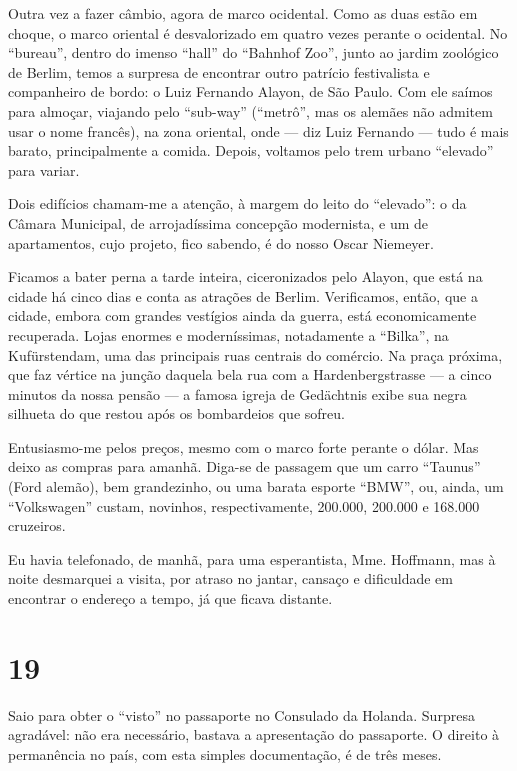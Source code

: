 Outra vez a fazer câmbio, agora de marco ocidental. Como as duas estão em choque, o marco oriental é desvalorizado em quatro vezes perante o ocidental. No ``bureau'', dentro do imenso ``hall'' do ``Bahnhof Zoo'', junto ao jardim zoológico de Berlim, temos a surpresa de encontrar outro patrício festivalista e companheiro de bordo: o Luiz Fernando Alayon, de São Paulo. Com ele saímos para almoçar, viajando pelo ``sub-way'' (``metrô'', mas os alemães não admitem usar o nome francês), na zona oriental, onde --- diz Luiz Fernando --- tudo é mais barato, principalmente a comida. Depois, voltamos pelo trem urbano ``elevado'' para variar.

Dois edifícios chamam-me a atenção, à margem do leito do ``elevado'': o da Câmara Municipal, de arrojadíssima concepção modernista, e um de apartamentos, cujo projeto, fico sabendo, é do nosso Oscar Niemeyer.

Ficamos a bater perna a tarde inteira, ciceronizados pelo Alayon, que está na cidade há cinco dias e conta as atrações de Berlim. Verificamos, então, que a cidade, embora com grandes vestígios ainda da guerra, está economicamente recuperada. Lojas enormes e moderníssimas, notadamente a ``Bilka'', na Kufürstendam, uma das principais ruas centrais do comércio. Na praça próxima, que faz vértice na junção daquela bela rua com a Hardenbergstrasse --- a cinco minutos da nossa pensão --- a famosa igreja de Gedächtnis exibe sua negra silhueta do que restou após os bombardeios que sofreu.

Entusiasmo-me pelos preços, mesmo com o marco forte perante o dólar. Mas deixo as compras para amanhã. Diga-se de passagem que um carro ``Taunus'' (Ford alemão), bem grandezinho, ou uma barata esporte ``BMW'', ou, ainda, um ``Volkswagen'' custam, novinhos, respectivamente, 200.000, 200.000 e 168.000 cruzeiros.

Eu havia telefonado, de manhã, para uma esperantista, Mme. Hoffmann, mas à noite desmarquei a visita, por atraso no jantar, cansaço e dificuldade em encontrar o endereço a tempo, já que ficava distante.

\section*{19 \adfflatleafright {}}
Saio para obter o ``visto'' no passaporte no Consulado da Holanda. Surpresa agradável: não era necessário, bastava a apresentação do passaporte. O direito à permanência no país, com esta simples documentação, é de três meses.

